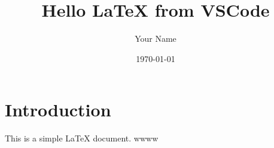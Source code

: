 \documentclass{article}
\title{Hello LaTeX from VSCode}
\author{Your Name}
\date{\today}
\begin{document}
\maketitle

\section{Introduction}

This is a simple LaTeX document. wwww
\end{document}
